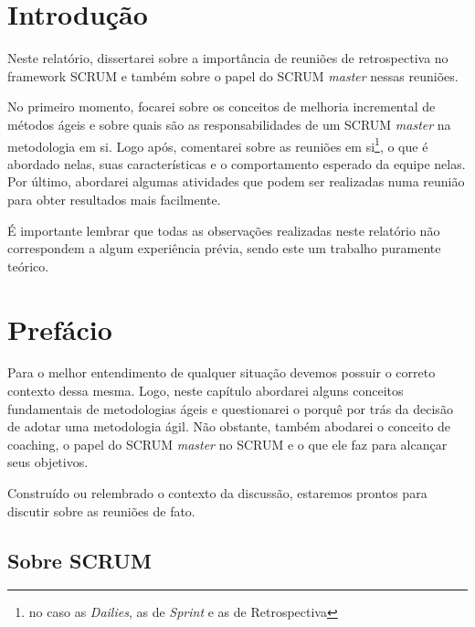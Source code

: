 \documentclass{iiufrgs}
\begin{document}
%

\chapter{Introdução}\label{intro}

Neste relatório, dissertarei sobre a importância de reuniões de retrospectiva no framework SCRUM e também sobre o papel do SCRUM \textit{master} nessas reuniões. 

No primeiro momento, focarei sobre os conceitos de melhoria incremental de métodos ágeis e sobre quais são as responsabilidades de um SCRUM \textit{master} na metodologia em si. Logo após, comentarei sobre as reuniões em si\footnote{no caso as \textit{Dailies}, as de \textit{Sprint} e as de Retrospectiva}, o que é abordado nelas, suas características e o comportamento esperado da equipe nelas. Por último, abordarei algumas atividades que podem ser realizadas numa reunião para obter resultados mais facilmente.

É importante lembrar que todas as observações realizadas neste relatório não correspondem a algum experiência prévia, sendo este um trabalho puramente teórico.


%

\chapter{Prefácio}\label{pref}

Para o melhor entendimento de qualquer situação devemos possuir o correto contexto dessa mesma. Logo, neste capítulo abordarei alguns conceitos fundamentais de metodologias ágeis e questionarei o porquê por trás da decisão de adotar uma metodologia ágil. Não obstante, também abodarei o conceito de coaching, o papel do SCRUM \textit{master} no SCRUM e o que ele faz para alcançar seus objetivos.

Construído ou relembrado o contexto da discussão, estaremos prontos para discutir sobre as reuniões de fato.

\section{Sobre SCRUM}\label{scrum}





 
\end{document}
